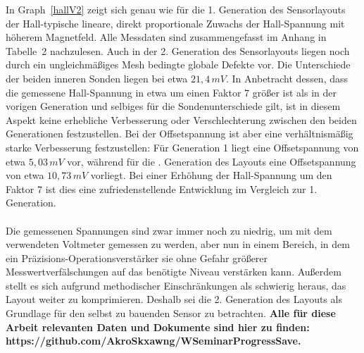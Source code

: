 \documentclass[12pt, a4paper]{article}
\begin{document}
In Graph~\ref*{hallV2} zeigt sich genau wie für die 1. Generation des Sensorlayouts der Hall-typische lineare, direkt proportionale Zuwachs der Hall-Spannung mit höherem Magnetfeld.\newline 
Alle Messdaten sind zusammengefasst im Anhang in Tabelle~2 nachzulesen.\newline
Auch in der 2. Generation des Sensorlayouts liegen noch durch ein ungleichmäßiges Mesh bedingte globale Defekte vor. Die Unterschiede der beiden inneren Sonden liegen bei \newline etwa $21,4\,mV$. In Anbetracht dessen, dass die gemessene Hall-Spannung in etwa um einen Faktor 7 größer ist als in der vorigen Generation und selbiges für die Sondenunterschiede gilt, ist in diesem Aspekt keine erhebliche Verbesserung oder Verschlechterung zwischen den beiden Generationen festzustellen.\newline
Bei der Offsetspannung ist aber eine verhältnismäßig starke Verbesserung festzustellen: Für Generation 1 liegt eine Offsetspannung von etwa $5,03\,mV$ vor, während für die . Generation des Layouts eine Offsetspannung von etwa $10,73\,mV$ vorliegt. Bei einer Erhöhung der Hall-Spannung um den Faktor 7 ist dies eine zufriedenstellende Entwicklung im Vergleich zur 1. Generation.\paragraph{}
Die gemessenen Spannungen sind zwar immer noch zu niedrig, um mit dem verwendeten Voltmeter gemessen zu werden, aber nun in einem Bereich, in dem ein Präzisions-Operationsverstärker sie ohne Gefahr größerer Messwertverfälschungen auf das benötigte Niveau verstärken kann. Außerdem stellt es sich aufgrund methodischer Einschränkungen als schwierig heraus, das Layout weiter zu komprimieren. Deshalb sei die 2. Generation des Layouts als Grundlage für den selbst zu bauenden Sensor zu betrachten.\newline
\textbf{Alle für diese Arbeit relevanten Daten und Dokumente sind hier zu finden: https://github.com/AkroSkxawng/WSeminarProgressSave.}
\end{document}
